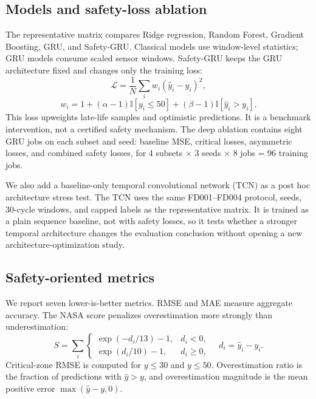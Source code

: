 \documentclass[10pt,twocolumn]{article}
\begin{document}
\subsection{Models and safety-loss ablation}

The representative matrix compares Ridge regression, Random Forest, Gradient Boosting, GRU, and Safety-GRU. Classical models use window-level statistics; GRU models consume scaled sensor windows. Safety-GRU keeps the GRU architecture fixed and changes only the training loss:
\begin{equation}
\mathcal{L}=\frac{1}{N}\sum_i w_i(\hat{y}_i-y_i)^2,
\end{equation}
\begin{equation}
 w_i = 1 + (\alpha-1)\mathbb{I}[y_i\leq 50] + (\beta-1)\mathbb{I}[\hat{y}_i>y_i].
\end{equation}
This loss upweights late-life samples and optimistic predictions. It is a benchmark intervention, not a certified safety mechanism. The deep ablation contains eight GRU jobs on each subset and seed: baseline MSE, critical losses, asymmetric losses, and combined safety losses, for 4 subsets $\times$ 3 seeds $\times$ 8 jobs = 96 training jobs.

We also add a baseline-only temporal convolutional network (TCN) as a post hoc architecture stress test. The TCN uses the same FD001--FD004 protocol, seeds, 30-cycle windows, and capped labels as the representative matrix. It is trained as a plain sequence baseline, not with safety losses, so it tests whether a stronger temporal architecture changes the evaluation conclusion without opening a new architecture-optimization study.

\subsection{Safety-oriented metrics}

We report seven lower-is-better metrics. RMSE and MAE measure aggregate accuracy. The NASA score penalizes overestimation more strongly than underestimation:
\begin{equation}
S = \sum_i
\begin{cases}
\exp(-d_i/13)-1, & d_i < 0,\\
\exp(d_i/10)-1, & d_i \ge 0,
\end{cases}
\quad d_i=\hat{y}_i-y_i.
\end{equation}
Critical-zone RMSE is computed for $y\leq30$ and $y\leq50$. Overestimation ratio is the fraction of predictions with $\hat{y}>y$, and overestimation magnitude is the mean positive error $\max(\hat{y}-y,0)$.
\end{document}
